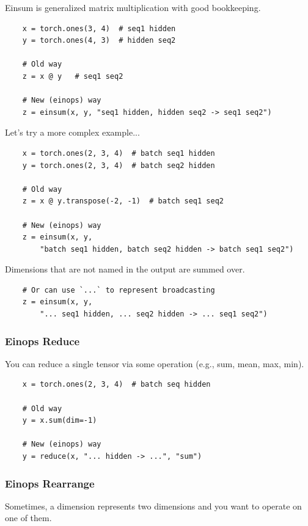 \documentclass[12pt,twoside]{article}
\begin{document}
Einsum is generalized matrix multiplication with good bookkeeping.

\begin{verbatim}
    x = torch.ones(3, 4)  # seq1 hidden 
    y = torch.ones(4, 3)  # hidden seq2 
    
    # Old way
    z = x @ y   # seq1 seq2 
    
    # New (einops) way
    z = einsum(x, y, "seq1 hidden, hidden seq2 -> seq1 seq2")
\end{verbatim}

Let's try a more complex example...

\begin{verbatim}
    x = torch.ones(2, 3, 4)  # batch seq1 hidden 
    y = torch.ones(2, 3, 4)  # batch seq2 hidden 
    
    # Old way
    z = x @ y.transpose(-2, -1)  # batch seq1 seq2  
    
    # New (einops) way
    z = einsum(x, y, 
        "batch seq1 hidden, batch seq2 hidden -> batch seq1 seq2") 
\end{verbatim}

Dimensions that are not named in the output are summed over.

\begin{verbatim}
    # Or can use `...` to represent broadcasting 
    z = einsum(x, y, 
        "... seq1 hidden, ... seq2 hidden -> ... seq1 seq2")
\end{verbatim}

\subsubsection*{Einops Reduce}

You can reduce a single tensor via some operation (e.g., sum, mean, max, min).

\begin{verbatim}
    x = torch.ones(2, 3, 4)  # batch seq hidden 
    
    # Old way
    y = x.sum(dim=-1)  
    
    # New (einops) way
    y = reduce(x, "... hidden -> ...", "sum")  
\end{verbatim}

\subsubsection*{Einops Rearrange}

Sometimes, a dimension represents two dimensions and you want to operate on one of them.
\end{document}
